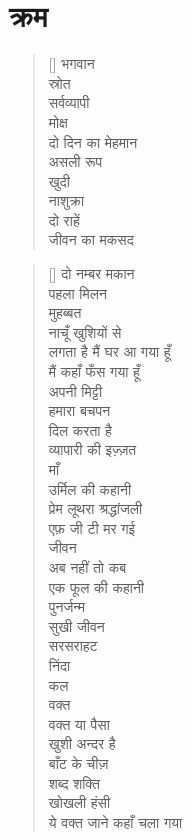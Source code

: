 \chapter{\texthindi{क्रम}}


\settowidth{\versewidth}{This is the average line and so is this}
\begin{verse}[\versewidth]\texthindi{
\texthindi
भगवान\\
स्रोत\\
सर्वव्यापी\\
मोक्ष\\
दो दिन का मेहमान\\
असली रूप\\
खुदी\\
नाशुक्रा\\
दो राहें\\
जीवन का मकसद
}
\end{verse}

\begin{verse}[\versewidth]\texthindi{
दो नम्बर मकान\\
पहला मिलन\\
मुहब्बत\\
नाचूँ खुशियों से\\
लगता है मैं घर आ गया हूँ\\
मैं कहाँ फँस गया हूँ\\
अपनी मिट्टी\\
हमारा बचपन\\
दिल करता है\\
व्यापारी की इज़्ज़त\\
माँ\\
उर्मिल की कहानी\\
प्रेम लूथरा श्रद्धांजली\\
एफ़ जी टी मर गई\\
जीवन\\
अब नहीं तो कब\\
एक फूल की कहानी\\
पुनर्जन्म\\
सुखी जीवन\\
सरसराहट\\
निंदा\\
कल\\
वक्त\\
वक्त या पैसा\\
खुशी अन्दर है\\
बाँट के चीज़\\
शब्द शक्ति\\
खोखली हंसी\\
ये वक्त जाने कहाँ चला गया
}
\end{verse}

